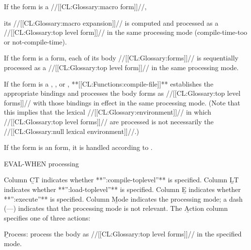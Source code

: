  
  If the form is a //[[CL:Glossary:macro form]]//,

its //[[CL:Glossary:macro expansion]]// is computed and processed as a  //[[CL:Glossary:top level form]]// in the same processing mode (compile-time-too or not-compile-time).
 
  If the form is a  form, each of its body //[[CL:Glossary:forms]]// is sequentially processed as a  //[[CL:Glossary:top level form]]// in the same processing mode.
 
  If the form is a ,  , or ,  **[[CL:Functions:compile-file]]** establishes the appropriate bindings and processes the body forms as //[[CL:Glossary:top level forms]]// with those bindings in effect in the same processing mode.  (Note that this implies that the lexical //[[CL:Glossary:environment]]// in which //[[CL:Glossary:top level forms]]// are processed is not necessarily the //[[CL:Glossary:null lexical environment]]//.)
 
  If the form is an  form, it is handled according to \thenextfigure.

 \caption{EVAL-WHEN processing} \endfig

Column \b{CT}   indicates whether **'':compile-toplevel''** is specified. Column \b{LT}   indicates whether **'':load-toplevel''** is specified. Column \b{E}    indicates whether **'':execute''** is specified.   Column \b{Mode} indicates the processing mode;  		a dash (---) indicates that the processing mode is not relevant.
    The \b{Action} column specifies one of three actions:

\beginlist

 \item{}\b{Process:} process the body as //[[CL:Glossary:top level forms]]// in the specified mode.
 
